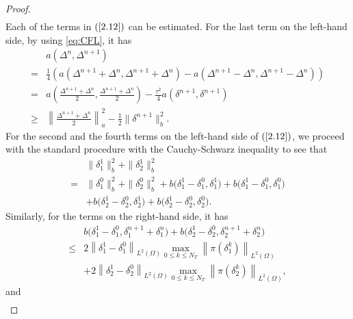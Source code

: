\documentclass[preprint,12pt]{elsarticle}
\begin{document}
\begin{proof}
\begin{equation}
\begin{aligned}
\end{aligned}
\end{equation}
Each of the terms in $(\ref{2.12})$ can be estimated. For the last term on the left-hand side, by using \eqref{eq:CFL}, it has
\begin{equation}\label{2.13}
\begin{aligned}
     &a(\Delta^{n},\Delta^{n+1})\\
     =&\frac{1}{4}\left(a(\Delta^{n+1}+\Delta^{n},\Delta^{n+1}+\Delta^{n})-a(\Delta^{n+1}-\Delta^{n},\Delta^{n+1}-\Delta^{n})\right)\\
     =&a\left(\frac{\Delta^{n+1}+\Delta^{n}}{2},\frac{\Delta^{n+1}+\Delta^{n}}{2}\right)-\frac{\tau^2}{4}a(\delta^{n+1},\delta^{n+1})\\
     \geq&\left\|\frac{\Delta^{n+1}+\Delta^{n}}{2}\right\|_a^2-\frac{1}{2}\|\delta^{n+1}\|_b^2.
\end{aligned}
\end{equation}
For the second and the fourth terms on the left-hand side of $(\ref{2.12})$, we proceed with the standard procedure with the Cauchy-Schwarz inequality to see that
\begin{equation}\label{2.14}
\begin{aligned}
     &\|\delta_1^{1}\|_b^2+\|\delta_2^{1}\|_b^2\\
     =&\|\delta_1^0\|_b^2+\|\delta_2^0\|_b^2+b\big(\delta_1^1-\delta_1^0,\delta_1^1\big)
     +b\big(\delta_1^1-\delta_1^0,\delta_1^0\big)\\
     &+b\big(\delta_2^1-\delta_2^0,\delta_2^1\big)+b\big(\delta_2^1-\delta_2^0,\delta_2^0\big).
\end{aligned}
\end{equation}
Similarly, for the terms on the right-hand side, it has
\begin{equation}\label{2.15}
\begin{aligned}
     &b\big(\delta_1^1-\delta_1^0,\delta_1^{n+1}+\delta_1^{n}\big)+b\big(\delta_2^1-\delta_2^0,\delta_2^{n+1}+\delta_2^{n}\big)\\
     \leq& 2\left\|\delta_1^1-\delta_1^0\right\|_{L^2(\Omega)}\max_{0\leq k\leq N_T}\left\|\pi(\delta_1^k)\right\|_{L^2(\Omega)}\\
     &+2\left\|\delta_2^1-\delta_2^0\right\|_{L^2(\Omega)}\max_{0\leq k\leq N_T}\left\|\pi(\delta_2^k)\right\|_{L^2(\Omega)},
\end{aligned}
\end{equation}
and
\begin{equation}\label{2.16}
\begin{aligned}

\end{aligned}
\end{equation}
\end{proof}
\end{document}
